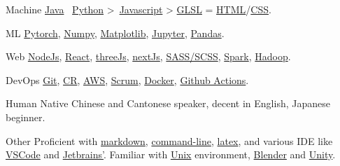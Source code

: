 
\begin{cvskills}
  \cvskill
  {Machine}
  {\href{https://www.java.com/en/}{Java} \approx\, \href{https://www.python.org/}{Python} >\, \href{https://www.javascript.com/}{Javascript} > \href{https://www.khronos.org/opengl/wiki/OpenGL_Shading_Language}{GLSL} = \href{https://developer.mozilla.org/en-US/docs/Glossary/HTML5}{HTML}/\href{https://developer.mozilla.org/en-US/docs/Web/CSS}{CSS}.}
  
  \cvskill
  {ML} %
  {\href{https://pytorch.org/}{Pytorch}, \href{https://numpy.org/}{Numpy}, \href{https://matplotlib.org/}{Matplotlib}, \href{https://jupyter.org/}{Jupyter}, \href{https://pandas.pydata.org/}{Pandas}.}  %

  \cvskill
  {Web} %
  {\href{https://nodejs.org/en/}{NodeJs}, \href{https://reactjs.org/}{React}, \href{https://threejs.org/}{threeJs}, \href{https://nextjs.org/}{nextJs}, \href{https://sass-lang.com/}{SASS/SCSS}, \href{https://spark.apache.org/}{Spark}, \href{https://hadoop.apache.org/}{Hadoop}.}
  
  \cvskill
    {DevOps} %
    {\href{https://git-scm.com/}{Git}, \href{https://en.wikipedia.org/wiki/Code_review}{CR}, \href{https://aws.amazon.com/}{AWS}, \href{https://www.scrum.org/resources/what-is-scrum}{Scrum}, \href{https://www.docker.com/}{Docker}, \href{https://github.com/features/actions}{Github Actions}.}
 
  \cvskill
    {Human}
    {Native Chinese and Cantonese speaker, decent in English, Japanese beginner.}

  \cvskill
    {Other} %
    {Proficient with \href{https://en.wikipedia.org/wiki/Markdown}{markdown}, \href{https://en.wikipedia.org/wiki/Command-line_interface}{command-line}, \href{https://www.latex-project.org/}{latex}, and various IDE like \href{https://code.visualstudio.com/}{VSCode} and \href{https://www.jetbrains.com/}{Jetbrains'}. Familiar with \href{https://en.wikipedia.org/wiki/Unix}{Unix} environment, \href{https://www.blender.org/}{Blender} and \href{https://unity.com/}{Unity}.}

\end{cvskills}
